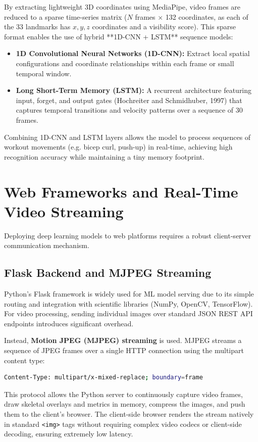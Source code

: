 By extracting lightweight 3D coordinates using MediaPipe, video frames are reduced to a sparse time-series matrix ($N$ frames $\times$ 132 coordinates, as each of the 33 landmarks has $x, y, z$ coordinates and a visibility score). This sparse format enables the use of hybrid **1D-CNN + LSTM** sequence models:
\begin{itemize}
    \item \textbf{1D Convolutional Neural Networks (1D-CNN):} Extract local spatial configurations and coordinate relationships within each frame or small temporal window.
    \item \textbf{Long Short-Term Memory (LSTM):} A recurrent architecture featuring input, forget, and output gates (Hochreiter and Schmidhuber, 1997) that captures temporal transitions and velocity patterns over a sequence of 30 frames.
\end{itemize}
Combining 1D-CNN and LSTM layers allows the model to process sequences of workout movements (e.g. bicep curl, push-up) in real-time, achieving high recognition accuracy while maintaining a tiny memory footprint.

\section{Web Frameworks and Real-Time Video Streaming}
Deploying deep learning models to web platforms requires a robust client-server communication mechanism. 

\subsection{Flask Backend and MJPEG Streaming}
Python's Flask framework is widely used for ML model serving due to its simple routing and integration with scientific libraries (NumPy, OpenCV, TensorFlow). For video processing, sending individual images over standard JSON REST API endpoints introduces significant overhead. 

Instead, \textbf{Motion JPEG (MJPEG) streaming} is used. MJPEG streams a sequence of JPEG frames over a single HTTP connection using the multipart content type:
\begin{lstlisting}[language=bash]
Content-Type: multipart/x-mixed-replace; boundary=frame
\end{lstlisting}
This protocol allows the Python server to continuously capture video frames, draw skeletal overlays and metrics in memory, compress the images, and push them to the client's browser. The client-side browser renders the stream natively in standard \texttt{<img>} tags without requiring complex video codecs or client-side decoding, ensuring extremely low latency.

